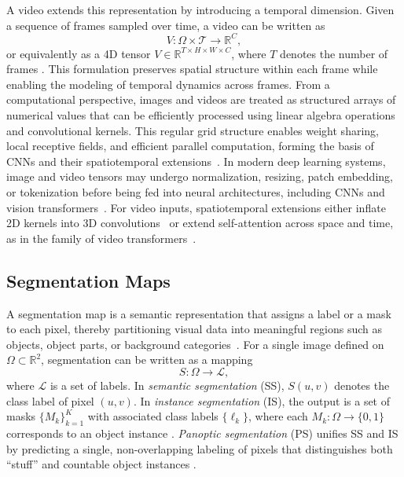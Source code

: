 A video extends this representation by introducing a temporal dimension.
Given a sequence of frames sampled over time, a video can be written as
\begin{equation}
V: \Omega \times \mathcal{T} \rightarrow \mathbb{R}^C,
\end{equation}
or equivalently as a 4D tensor $V \in \mathbb{R}^{T \times H \times W \times C}$, where $T$ denotes the number of frames \cite{szeliski2022}. 
This formulation preserves spatial structure within each frame while enabling the modeling of temporal dynamics across frames.
From a computational perspective, images and videos are treated as structured arrays of numerical values that can be efficiently processed using linear algebra operations and convolutional kernels. 
This regular grid structure enables weight sharing, local receptive fields, and efficient parallel computation, forming the basis of CNNs and their spatiotemporal extensions~\cite{lecun1998gradient,karpathy2014large}. 
In modern deep learning systems, image and video tensors may undergo normalization, resizing, patch embedding, or tokenization before being fed into neural
architectures, including CNNs and vision transformers~\cite{vit, liu2022convnet}.
For video inputs, spatiotemporal extensions either inflate 2D kernels into 3D convolutions~\cite{tran2015learning, carreira2017quo} or extend self-attention across space and time, as in the family of video transformers~\cite{arnab2021vivit, liu2022videoswin}.






\subsection{Segmentation Maps}
\label{subsec:p-2-sec-4-2D-segmentation-maps}
A segmentation map is a semantic representation that assigns a label or a mask to each pixel, thereby partitioning visual data into meaningful regions such as objects, object parts, or background categories~\cite{szeliski2022,li2023seg_survey}. For a single image defined on $\Omega \subset \mathbb{R}^2$, segmentation can be written as a mapping
\begin{equation}
S: \Omega \rightarrow \mathcal{L},
\end{equation}
where $\mathcal{L}$ is a set of labels. In \emph{semantic segmentation} (SS), $S(u,v)$ denotes the class label of pixel $(u,v)$. 
In \emph{instance segmentation} (IS), the output is a set of masks
$\{M_k\}_{k=1}^{K}$ with associated class labels $\{\ell_k\}$, where each $M_k:\Omega \rightarrow \{0,1\}$ corresponds to an object instance \cite{long2015fcn, he2017mask}.
 \emph{Panoptic segmentation} (PS) unifies SS and IS by predicting a single, non-overlapping labeling of pixels that distinguishes both ``stuff'' and countable object instances \cite{kirillov2019panoptic}.

